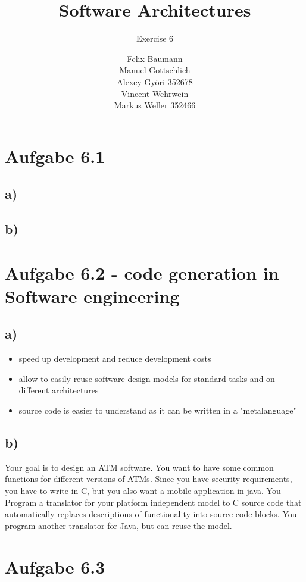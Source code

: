 \documentclass[a4paper,10pt]{scrartcl}[2003/01/01]
\title{Software Architectures}
\subtitle{Exercise 6}
\author{ Felix Baumann \\ Manuel Gottschlich \\  Alexey Gy\"ori 352678 \\ Vincent Wehrwein \\ Markus Weller 352466}
\begin{document}
    \maketitle
    
    \section*{Aufgabe 6.1}
        \subsection*{a)}
        \subsection*{b)}
    \section*{Aufgabe 6.2 - code generation in Software engineering}
        \subsection*{a)}
        	\begin{itemize}
        		\item speed up development and reduce development costs
        		\item allow to easily reuse software design models for standard tasks and on different architectures
        		\item source code is easier to understand as it can be written in a "metalanguage"
        \end{itemize}
        \subsection*{b)}
        	Your goal is to design an ATM software. You want to have some common functions for different versions of ATMs. Since you have security requirements, you have to write in C, but you also want a mobile application in java. You Program a translator for your platform independent model to C source code that automatically replaces descriptions of functionality into source code blocks. You program another translator for Java, but can reuse the model.
        
        \newpage
    \section*{Aufgabe 6.3}
\end{document}
